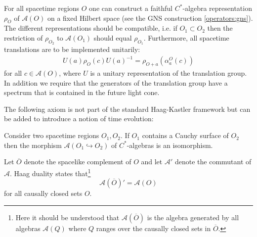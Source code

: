     \begin{axiom}[Spectrum]
        For all spacetime regions $O$ one can construct a faithful $C^*$-algebra representation $\rho_O$ of $\mathcal{A}(O)$ on a fixed Hilbert space (see the GNS construction \ref{operators:gns}). The different representations should be compatible, i.e. if $O_1\subset O_2$ then the restriction of $\rho_{O_2}$ to $\mathcal{A}(O_1)$ should equal $\rho_{O_1}$. Furthermore, all spacetime translations are to be implemented unitarily:
        \begin{gather}
            U(a)\rho_O(c)U(a)^{-1} = \rho_{O+a}(\alpha^O_a(c))
        \end{gather}
        for all $c\in\mathcal{A}(O)$, where $U$ is a unitary representation of the translation group. In addition we require that the generators of the translation group have a spectrum that is contained in the future light cone.
    \end{axiom}

    The following axiom is not part of the standard Haag-Kastler framework but can be added to introduce a notion of time evolution:
    \begin{axiom}
        Consider two spacetime regions $O_1, O_2$. If $O_1$ contains a Cauchy surface of $O_2$ then the morphism $\mathcal{A}(O_1\hookrightarrow O_2)$ of $C^*$-algebras is an isomorphism.
    \end{axiom}

    \begin{axiom}
        Let $\overline{O}$ denote the spacelike complement of $O$ and let $\mathcal{A}'$ denote the commutant of $\mathcal{A}$. Haag duality states that\footnote{Here it should be understood that $\mathcal{A}\left(\overline{O}\right)$ is the algebra generated by all algebras $\mathcal{A}(Q)$ where $Q$ ranges over the causally closed sets in $\overline{O}$.}
        \begin{equation}
            \mathcal{A}\left(\overline{O}\right)' = \mathcal{A}(O)
        \end{equation}
        for all causally closed sets $O$.
    \end{axiom}

